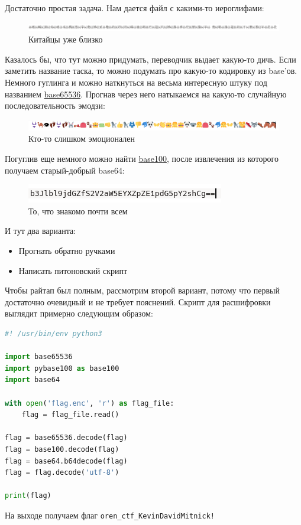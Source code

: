 \documentclass[idxtotoc,hyperref,openany,oneside]{files/crypto} %
\begin{document}
Достаточно простая задача. Нам дается файл с какими-то иероглифами:
\begin{figure}[H]
\begin{center}
\includegraphics[width=1.0\linewidth]{files/chinese}
\end{center}
\caption{Китайцы уже близко}
\label{fig:chinese}
\end{figure}
Казалось бы, что тут можно придумать, переводчик выдает какую-то дичь. Если заметить название таска, то можно подумать про какую-то кодировку из base'ов. Немного гуглинга и можно наткнуться на весьма интересную штуку под названием \href{https://github.com/qntm/base65536}{base65536}. Прогнав через него натыкаемся на какую-то случайную последовательность эмодзи:
\begin{figure}[H]
\begin{center}
\includegraphics[width=1.0\linewidth]{files/emoji}
\end{center}
\caption{Кто-то слишком эмоционален}
\label{fig:emoji}
\end{figure}
Погуглив еще немного можно найти \href{https://github.com/AdamNiederer/base100}{base100}, после извлечения из которого получаем старый-добрый base64:
\begin{figure}[H]
\begin{center}
\includegraphics[width=0.7\linewidth]{files/base64}
\end{center}
\caption{То, что знакомо почти всем}
\label{fig:base64}
\end{figure}
И тут два варианта:
\begin{itemize}
\item Прогнать обратно ручками
\item Написать питоновский скрипт
\end{itemize}
Чтобы райтап был полным, рассмотрим второй вариант, потому что первый достаточно очевидный и не требует пояснений. Скрипт для расшифровки выглядит примерно следующим образом:
\newpage
\begin{lstlisting}[language=Python, caption=Дешифровка флага]
#! /usr/bin/env python3

import base65536
import pybase100 as base100
import base64

with open('flag.enc', 'r') as flag_file:
    flag = flag_file.read()

flag = base65536.decode(flag)
flag = base100.decode(flag)
flag = base64.b64decode(flag)
flag = flag.decode('utf-8')

print(flag)
\end{lstlisting}

На выходе получаем флаг \verb|oren_ctf_KevinDavidMitnick!|

\end{document}
